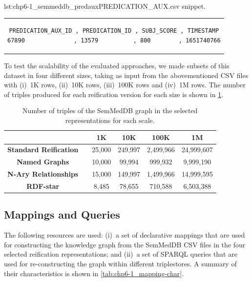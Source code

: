 \noindent\hspace{0.23\linewidth}\begin{minipage}{\linewidth}
\begin{captionedlisting}{lst:chp6-1_semmeddb_predaux}{PREDICATION\_AUX.csv snippet.}
\centering
\begin{tabular}{c}
\hspace{-7em}
{
\begin{lstlisting}[basicstyle=\ttfamily\small,label={lst:chp6-1_semmeddb_predaux},columns=flexible]
PREDICATION_AUX_ID , PREDICATION_ID , SUBJ_SCORE , TIMESTAMP
67890              , 13579          , 800        , 1651740766
\end{lstlisting}
}
\end{tabular}
\end{captionedlisting}
\end{minipage}


To test the scalability of the evaluated approaches, we made subsets of this dataset in four different sizes, taking as input from the abovementioned CSV files with (i)~1K rows, (ii)~10K rows, (iii)~100K rows and (iv)~1M rows. The number of triples produced for each reification version for each size is shown in \cref{tab:chp6-1_data-triple-number}.

\begin{table}[t]
\caption[SemMedDB scale sizes]{Number of triples of the SemMedDB graph in the selected representations for each scale.}
\label{tab:chp6-1_data-triple-number}
\centering
\begin{tabular}{cccccc}
    \cmidrule{2-6}
    & & \textbf{1K} & \textbf{10K} & \textbf{100K} & \textbf{1M} \\ \midrule
    \textbf{Standard Reification} & & 25,000 & 249,997 & 2,499,966 & 24,999,607 \\ \midrule
    \textbf{Named Graphs} & & 10,000 & 99,994 & 999,932 & 9,999,190 \\ \midrule
    \textbf{N-Ary Relationships} & & 15,000 & 149,997 & 1,499,966 & 14,999,595 \\ \midrule
    \textbf{RDF-star} & & 8,485 & 78,655 & 710,588 & 6,503,388 \\ \bottomrule
\end{tabular}
\end{table}




\subsection{Mappings and Queries}
\label{sec:chp6-1_map-queries}
The following resources are used: 
(i)~a set of declarative mappings that are used for constructing the knowledge graph from the SemMedDB CSV files in the four selected reification representations; and (ii)~a set of SPARQL queries that are used for re-constructing the graph within different triplestores. A summary of their characteristics is shown in \cref{tab:chp6-1_mapping-char}.

